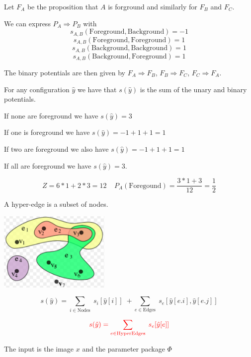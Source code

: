 {


\vfill
Let $F_A$ be the proposition that $A$ is forground and similarly for $F_B$ and $F_C$.

\vfill
We can express $P_A \Rightarrow P_B$ with
$$s_{A,B}(\mathrm{Foreground},\mathrm{Background}) = -1$$
$$s_{A,B}(\mathrm{Foreground},\mathrm{Foreground}) = 1$$
$$s_{A,B}(\mathrm{Background},\mathrm{Background}) = 1$$
$$s_{A,B}(\mathrm{Background},\mathrm{Foreground}) = 1$$

\vfill
The binary potentials are then given by
$F_A \Rightarrow F_B$, $F_B \Rightarrow F_C$, $F_C \Rightarrow F_A$.


For any configuration $\hat{y}$ we have that $s(\hat{y})$ is the sum of the unary and binary potentials.

\vfill
If none are foreground we have $s(\hat{y}) = 3$

\vfill
If one is foreground we have $s(\hat{y}) = -1 + 1+ 1 = 1$

\vfill
If two are foreground we also have $s(\hat{y}) = -1 + 1+ 1 = 1$

\vfill
If all are foreground we have $s(\hat{y}) = 3$.

\vfill
$$Z = 6*1 + 2*3 = 12\;\;\;\;P_A(\mathrm{Foregound}) = \frac{3*1 + 3}{12} = \frac{1}{2}$$


A hyper-edge is a subset of nodes.

\vfill
\centerline{\includegraphics[height = 1.5in]{../images/HyperGraph}}


$$s(\hat{y}) = \sum_{i \in \mathrm{Nodes}}\; s_i[\hat{y}[i]]\; + \sum_{e \in \mathrm{Edges}}\;s_e[\hat{y}[e.i],\hat{y}[e.j]]$$

\vfill

$${\color{red} s(\hat{y}) = \sum_{e \in \mathrm{HyperEdges}}  \; s_e[\hat{y}[e]]}$$



The input is the image $x$ and the parameter package $\Phi$

}
